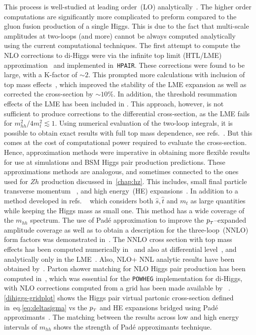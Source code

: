 This process is well-studied at leading order~(LO) analytically~\cite{EBOLI1987269,GLOVER1988282,DICUS1988457,Plehn:1996wb}.  The higher order computations are significantly more complicated to preform compared to the gluon fusion production of a single Higgs. This is due to the fact that multi-scale amplitudes at two-loops (and more) cannot be always computed analytically using the current computational techniques.  The first attempt to compute the NLO corrections to di-Higgs were via the infinite top limit (HTL/LME)  approximation~\cite{Dawson:1998py, Altenkamp:2012sx,Grigo:2014jma} and implemented in~\texttt{HPAIR}. These corrections were found to be large, with a K-factor of $ \sim 2$.  This prompted more calculations with inclusion of top mass effects~\cite{deFlorian:2013uza,Grigo:2013rya,Maltoni:2014eza,Grigo:2015dia,Degrassi:2016vss}, which improved the stability of the LME expansion as well as corrected the cross-section by $\sim 10\%$. In addition, the threshold resummation effects of the LME has been included in \cite{Shao:2013bz}. This approach, however, is not sufficient to produce corrections to the differential cross-section, as the LME fails for $m_{hh}^2/4m_t^2 \lesssim 1$. Using numerical evaluation of the two-loop integrals, it is possible to obtain exact results with full top mass dependence, see refs.~\cite{Borowka:2016ypz,Borowka:2016ehy,Baglio:2018lrj}. But this comes at the cost of computational power required to evaluate the cross-section.  Hence, approximation methods were imperative in obtaining more flexible results for use at simulations and BSM Higgs pair production predictions.  These approximations methods are analogous, and sometimes connected  to the ones used for $Zh$ production discussed in~\autoref{chap:hz}. This includes, small final particle transverse momentum ~\cite{Bonciani:2018omm}, and high energy~(HE) expansions~\cite{Davies:2018ood,Davies:2018qvx}. In addition to a method developed in refs. ~\cite{Xu:2018eos,Wang:2020nnr} which considers both $\hat s , \hat t$ and $m_t$ as large quantities while keeping the Higgs mass as small one. This method has a wide coverage of the $m_{hh}$ spectrum.  The use of Pad\'e approximation to improve the $p_{\scriptscriptstyle T}$--expanded amplitude coverage as well as to obtain a description for the three-loop~(NNLO) form factors was demonstrated in~\cite{Davies:2019nhm}. The NNLO cross section with top mass effects has been computed numerically in~\cite{Grazzini:2018bsd} and also at differential level~\cite{deFlorian:2016uhr}, and analytically only in the LME~\cite{deFlorian:2013jea}. Also, NLO+ NNL analytic results have been obtained by~\cite{deFlorian:2015moa}. Parton shower matching for NLO Higgs pair production has been computed  in~\cite{Jones:2017giv,Heinrich:2019bkc}, which was essential for the \texttt{POWHEG} implementation for di-Higgs, with NLO corrections computed from a grid has been made available by ~\cite{Heinrich:2017kxx,Heinrich:2019bkc,Heinrich:2020ckp}. \autoref{dihiggs-gridplot} shows the Higgs pair virtual partonic cross-section defined in~eq.\eqref{eq:deltasigma} vs the  $p_{\scriptscriptstyle T}$ and HE expansions bridged using Pad\'e  approximants~\cite{Bellafronte:2022jmo}.  The matching between the results across low and high energy intervals of $m_{hh}$ shows the strength of Pad\'e  approximants technique.  